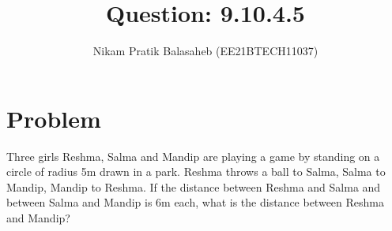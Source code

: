 \documentclass[journal,12pt,twocolumn]{IEEEtran}
\begin{document}
\let\StandardTheFigure\thefigure
\let\vec\mathbf
\renewcommand{\thefigure}{\theproblem}



\def\putbox#1#2#3{\makebox[0in][l]{\makebox[#1][l]{}\raisebox{\baselineskip}[0in][0in]{\raisebox{#2}[0in][0in]{#3}}}}
     \def\rightbox#1{\makebox[0in][r]{#1}}
     \def\centbox#1{\makebox[0in]{#1}}
     \def\topbox#1{\raisebox{-\baselineskip}[0in][0in]{#1}}
     \def\midbox#1{\raisebox{-0.5\baselineskip}[0in][0in]{#1}}

\vspace{3cm}


\title{Question: 9.10.4.5}
\author{Nikam Pratik Balasaheb (EE21BTECH11037)}





\maketitle

\newpage


\bigskip

\renewcommand{\thefigure}{\theenumi}
\renewcommand{\thetable}{\theenumi}

\section{Problem}
Three girls Reshma, Salma and Mandip are playing a game by standing on a circle of radius 5m drawn in a park. Reshma throws a ball to Salma, Salma to Mandip, Mandip to Reshma. If the distance between Reshma and Salma and
between Salma and Mandip is 6m each, what is the distance between Reshma and Mandip?
\end{document}
